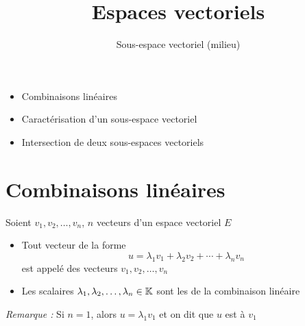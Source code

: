 






\title{{\bf Espaces vectoriels}}
\subtitle{Sous-espace vectoriel (milieu)}

\begin{frame}
  
  \debutmontitre

  \pause

{\footnotesize
\hfill
{}
\begin{minipage}{0.6\textwidth}
  \begin{itemize}
    \item<3-> Combinaisons linéaires
    \item<4-> Caractérisation d'un sous-espace vectoriel
    \item<5-> Intersection de deux sous-espaces vectoriels    
  \end{itemize}
\end{minipage}
}

\end{frame}

\setcounter{framenumber}{0}



\section{Combinaisons linéaires}



\begin{frame}
Soient  $v_1, v_2, \ldots, v_n$, $n$  vecteurs d'un espace vectoriel $E$
\begin{mydefinition}
  \begin{itemize}
    \item Tout vecteur de la forme  
 $$u=\lambda_1 v_1+\lambda_2v_2+ \cdots + \lambda_nv_n$$
 est appelé  des vecteurs $v_1, v_2, \ldots, v_n$
 
 \pause
 
    \item Les scalaires $\lambda_1, \lambda_2, \ldots , \lambda_n \in \mathbb{K}$ sont 
    les  de la combinaison linéaire
  \end{itemize}

\end{mydefinition}
 
 \bigskip
 \pause
 
\emph{Remarque :} Si $n=1$, alors $u=\lambda_1 v_1$ et on dit que $u$ est  à $v_1$ 
 
\end{frame}


